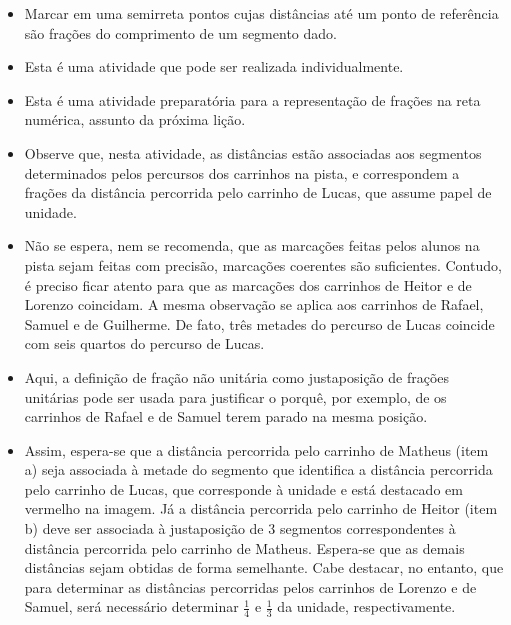 \begin{atividade}\label{chap2-ativ12}
\objetivos
\begin{itemize} %
    \item       Marcar em uma semirreta pontos cujas distâncias até um ponto de referência são frações do comprimento de um segmento dado.
\end{itemize} %

\discussoes
\begin{itemize} %
    \item       Esta é uma atividade que pode ser realizada individualmente.
    \item       Esta é uma atividade preparatória para a representação de frações na reta numérica, assunto da próxima lição.
    \item       Observe que, nesta atividade, as distâncias estão associadas aos segmentos determinados pelos percursos dos carrinhos na pista, e correspondem a frações da distância percorrida pelo carrinho de Lucas, que assume papel de unidade.
    \item       Não se espera, nem se recomenda, que as marcações feitas pelos alunos na pista sejam feitas com precisão, marcações coerentes são suficientes. Contudo, é preciso ficar atento para que as marcações dos carrinhos de Heitor e de Lorenzo coincidam. A mesma observação se aplica aos carrinhos de Rafael, Samuel e de Guilherme. De fato, três metades do percurso de Lucas coincide com seis quartos do percurso de Lucas.
    \item       Aqui, a definição de fração não unitária como justaposição de frações unitárias pode ser usada para justificar o porquê, por exemplo, de os carrinhos de Rafael e de Samuel terem parado na mesma posição.
    \item       Assim, espera-se que a distância percorrida pelo carrinho de Matheus (item a) seja associada à metade do segmento que identifica a distância percorrida pelo carrinho de Lucas, que corresponde à unidade e está destacado em vermelho na imagem. Já a distância percorrida pelo carrinho de Heitor (item b) deve ser associada à justaposição de       $3$ segmentos correspondentes à distância percorrida pelo carrinho de Matheus. Espera-se que as demais distâncias sejam obtidas de forma semelhante. Cabe destacar, no entanto, que para determinar as distâncias percorridas pelos carrinhos de Lorenzo e de Samuel, será necessário determinar       $\frac{1}{4}$ e       $\frac{1}{3}$ da unidade, respectivamente.

\end{itemize}
\end{atividade}
